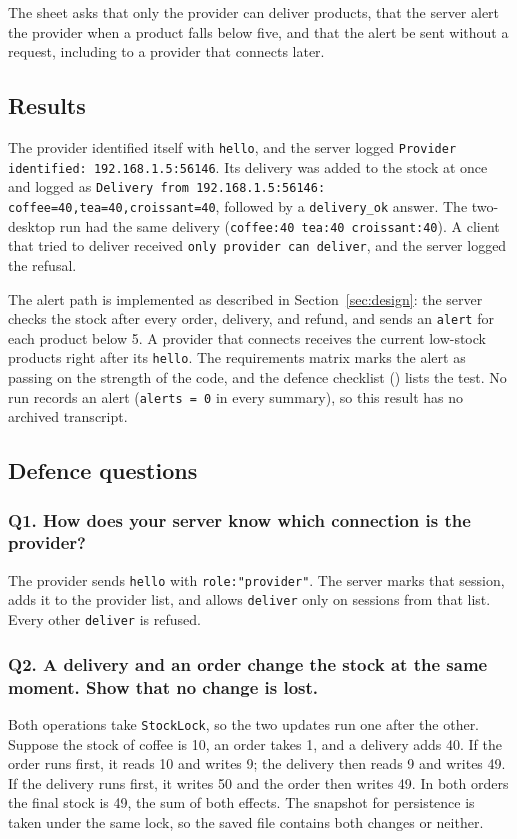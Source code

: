 \documentclass[12pt,a4paper]{article}
\begin{document}
The sheet asks that only the provider can deliver products, that the server alert
the provider when a product falls below five, and that the alert be sent without a
request, including to a provider that connects later.

\subsection{Results}

The provider identified itself with \texttt{hello}, and the server logged
\texttt{Provider identified: 192.168.1.5:56146}. Its delivery was added to the stock
at once and logged as \texttt{Delivery from 192.168.1.5:56146: coffee=40,tea=40,croissant=40},
followed by a \texttt{delivery\_ok} answer. The two-desktop run had the same delivery
(\texttt{coffee:40 tea:40 croissant:40}). A client that tried to deliver received
\texttt{only provider can deliver}, and the server logged the refusal.

The alert path is implemented as described in Section~\ref{sec:design}: the server
checks the stock after every order, delivery, and refund, and sends an \texttt{alert}
for each product below 5. A provider that connects receives the current low-stock
products right after its \texttt{hello}. The requirements matrix marks the alert as
passing on the strength of the code, and the defence checklist
() lists the test. No run records an alert
(\texttt{alerts = 0} in every summary), so this result has no archived transcript.

\subsection{Defence questions}

    \subsubsection{Q1. How does your server know which connection is the provider?}
    The provider sends \texttt{hello} with \texttt{role:"provider"}. The server marks
    that session, adds it to the provider list, and allows \texttt{deliver} only on
    sessions from that list. Every other \texttt{deliver} is refused.

    \subsubsection{Q2. A delivery and an order change the stock at the same moment. Show that no change is lost.}
    Both operations take \texttt{StockLock}, so the two updates run one after the other.
    Suppose the stock of coffee is 10, an order takes 1, and a delivery adds 40. If the
    order runs first, it reads 10 and writes 9; the delivery then reads 9 and writes 49.
    If the delivery runs first, it writes 50 and the order then writes 49. In both
    orders the final stock is 49, the sum of both effects. The snapshot for persistence
    is taken under the same lock, so the saved file contains both changes or neither.
\end{document}
